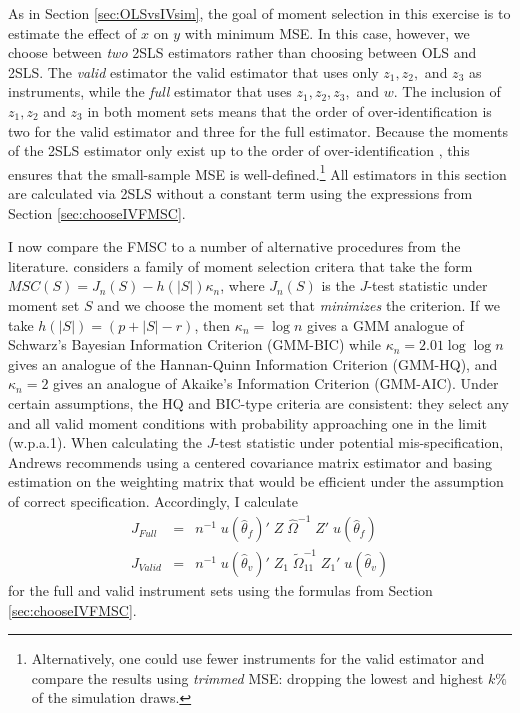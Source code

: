As in Section \ref{sec:OLSvsIVsim}, the goal of moment selection in this exercise is to estimate the effect of $x$ on $y$ with minimum MSE.
In this case, however, we choose between \emph{two} 2SLS estimators rather than choosing between OLS and 2SLS.
The \emph{valid} estimator the valid estimator that uses only $z_1, z_2,$ and $z_3$ as instruments, while the \emph{full} estimator that uses $z_1, z_2, z_3,$ and $w$. 
The inclusion of $z_1, z_2$ and $z_3$ in both moment sets means that the order of over-identification is two for the valid estimator and three for the full estimator. 
Because the moments of the 2SLS estimator only exist up to the order of over-identification \citep{Phillips1980}, this ensures that the small-sample MSE is well-defined.\footnote{Alternatively, one could use fewer instruments for the valid estimator and compare the results using \emph{trimmed} MSE: dropping the lowest and highest $k\%$ of the simulation draws.}
All estimators in this section are calculated via 2SLS without a constant term using the expressions from Section \ref{sec:chooseIVFMSC}.


I now compare the FMSC to a number of alternative procedures from the literature. 
\cite{Andrews1999} considers a family of moment selection critera that take the form $MSC(S) = J_n(S) - h(|S|)\kappa_n$, where $J_n(S)$ is the $J$-test statistic under moment set $S$ and we choose the moment set that \emph{minimizes} the criterion. 
If we take $h(|S|) = (p + |S| - r)$, then $\kappa_n = \log{n}$ gives a GMM analogue of Schwarz's Bayesian Information Criterion (GMM-BIC) while $\kappa_n = 2.01 \log{\log{n}}$ gives an analogue of the Hannan-Quinn Information Criterion (GMM-HQ), and $\kappa_n = 2$ gives an analogue of Akaike's Information Criterion (GMM-AIC). 
Under certain assumptions, the HQ and BIC-type criteria are consistent: they select any and all valid moment conditions with probability approaching one in the limit (w.p.a.1). 
When calculating the $J$-test statistic under potential mis-specification, Andrews recommends using a centered covariance matrix estimator and basing estimation on the weighting matrix that would be efficient under the assumption of correct specification. 
Accordingly, I calculate
	\begin{eqnarray}
		J_{Full} &=&n^{-1}\; u( \widehat{\theta}_{f})'\;Z \; \widehat{\Omega}^{-1} \;Z' \;u( \widehat{\theta}_{f})\\
		J_{Valid} &=&n^{-1}\; u( \widehat{\theta}_{v})'\;Z_1 \;\widetilde{\Omega}_{11}^{-1} \;Z_1'\;u( \widehat{\theta}_{v})
	\end{eqnarray}
for the full and valid instrument sets using the formulas from Section \ref{sec:chooseIVFMSC}. 

